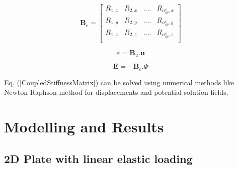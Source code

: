\documentclass[11pt]{article}
\begin{document}
\begin{equation} \label{BeMatrix}
\textbf{B}_e =
\begin{bmatrix}
R_{1,x} & R_{2,x} & .... & R_{n_{cp}^e,x} \\
R_{1,y} & R_{2,y} & .... & R_{n_{cp}^e,y} \\
R_{1,z} & R_{2,z} & .... & R_{n_{cp}^e,z} \\
\end{bmatrix}
\end{equation}

\begin{equation}
\varepsilon = \textbf{B}_u . \textbf{u}
\end{equation}

\begin{equation}
\textbf{E} = - \textbf{B}_e . \Phi
\end{equation}

\noindent
Eq. (\ref{CoupledStiffnessMatrix}) can be solved using numerical methods like
Newton-Raphson method for displacements and potential solution fields.

\newpage
\section{Modelling and Results}
\subsection{2D Plate with linear elastic loading}
\end{document}
